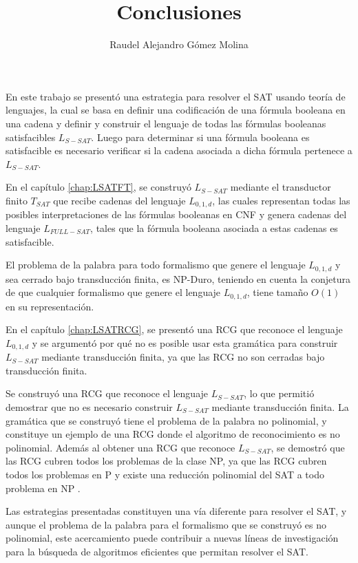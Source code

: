\documentclass[12pt]{article}
\title{Conclusiones}
\author{Raudel Alejandro Gómez Molina}
\begin{document}
\maketitle

En este trabajo se presentó una estrategia para resolver el SAT usando teoría de lenguajes, la cual se basa en definir
una codificación de una fórmula booleana en una cadena y definir y construir el lenguaje de todas las fórmulas booleanas
satisfacibles $L_{S-SAT}$. Luego para determinar si una fórmula booleana es satisfacible es necesario verificar si la cadena asociada
a dicha fórmula pertenece a $L_{S-SAT}$.

En el capítulo \ref{chap:LSATFT}, se construyó $L_{S-SAT}$ mediante el transductor finito $T_{SAT}$ que recibe
cadenas del lenguaje $L_{0,1,d}$, las cuales representan todas las posibles interpretaciones de las fórmulas
booleanas en CNF y genera cadenas del lenguaje $L_{FULL-SAT}$, tales que la fórmula booleana asociada a estas
cadenas es satisfacible.

El problema de la palabra para todo formalismo que genere
el lenguaje $L_{0,1,d}$ y sea cerrado bajo transducción finita, es NP-Duro, teniendo en cuenta la conjetura
de que cualquier formalismo que genere el lenguaje $L_{0,1,d}$, tiene tamaño $O(1)$ en su representación.

En el capítulo \ref{chap:LSATRCG}, se presentó una RCG que reconoce el lenguaje $L_{0,1,d}$ y se argumentó por qué no es posible
usar esta gramática para construir $L_{S-SAT}$ mediante transducción finita, ya que las RCG no son cerradas bajo transducción finita.

Se construyó una RCG que reconoce el lenguaje $L_{S-SAT}$, lo que permitió demostrar
que no es necesario construir $L_{S-SAT}$ mediante transducción finita. La gramática que se construyó tiene el problema
de la palabra no polinomial, y constituye un ejemplo de una RCG donde el algoritmo de reconocimiento es no polinomial.
Además al obtener una RCG que reconoce $L_{S-SAT}$, se demostró que las RCG cubren todos los problemas de la clase NP,
ya que las RCG cubren todos los problemas en P \cite{mainRCGBib} y existe una reducción polinomial del SAT a todo problema en NP \cite{authomataTheory}.

Las estrategias presentadas constituyen una vía diferente
para resolver el SAT, y aunque el problema de la palabra para el formalismo que se construyó es no polinomial,
este acercamiento puede contribuir a nuevas líneas de investigación para la búsqueda de algoritmos eficientes que permitan
resolver el SAT.
\end{document}
